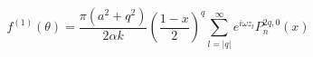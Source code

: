 \begin{equation}
f^{(1)}(\theta)=\frac{\pi(a^2+q^2)}{2\alpha k}\left(\frac{1-x}2\right)^q
\sum_{l=|q|}^\infty e^{i\omega z_l}P_n^{2q,0}(x) 
\end{equation}

